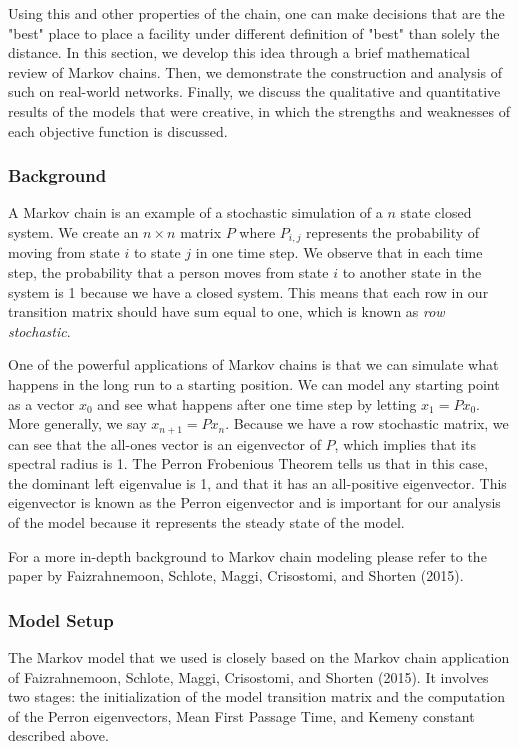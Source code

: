 \documentclass[twoside,twocolumn]{article}
\begin{document}
Using this and other properties of the chain, one can make decisions that are the "best" place to place a facility under different definition of "best" than solely the distance.
In this section, we develop this idea through a brief mathematical review of Markov chains.
Then, we demonstrate the construction and analysis of such on real-world networks.
Finally, we discuss the qualitative and quantitative results of the models that were creative, in which the strengths and weaknesses of each objective function is discussed.

\subsubsection{Background}

A Markov chain is an example of a stochastic simulation of a $n$ state closed system.
We create an $n\times n$ matrix $P$ where $P_{i,j}$ represents the probability of moving from state $i$ to state $j$ in one time step.
We observe that in each time step, the probability that a person moves from state $i$ to another state in the system is 1 because we have a closed system.
This means that each row in our transition matrix should have sum equal to one, which is known as {\em row stochastic}.

One of the powerful applications of Markov chains is that we can simulate what happens in the long run to a starting position.
We can model any starting point as a vector $x_0$ and see what happens after one time step by letting $x_1 = P x_0$.
More generally, we say $x_{n + 1} = P x_n$.
Because we have a row stochastic matrix, we can see that the all-ones vector is an eigenvector of $P$, which implies that its spectral radius is 1.
The Perron Frobenious Theorem tells us that in this case, the dominant left eigenvalue is 1, and that it has an all-positive eigenvector.
This eigenvector is known as the Perron eigenvector and is important for our analysis of the model because it represents the steady state of the model.

For a more in-depth background to Markov chain modeling please refer to the paper by Faizrahnemoon, Schlote, Maggi, Crisostomi, and Shorten (2015).

\subsubsection{Model Setup}

The Markov model that we used is closely based on the Markov chain application of Faizrahnemoon, Schlote, Maggi, Crisostomi, and Shorten (2015).
It involves two stages: the initialization of the model transition matrix and the computation of the Perron eigenvectors, Mean First Passage Time, and Kemeny constant described above. %
\end{document}
